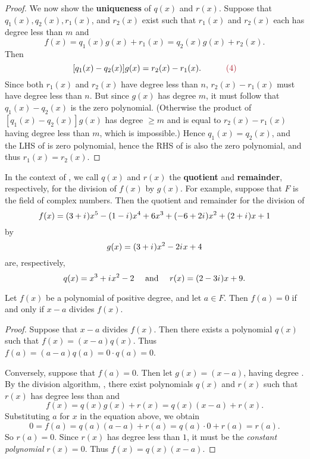 \begin{proof}
We now show the \textbf{uniqueness} of \(q(x)\) and \(r(x)\).
Suppose that \(q_1(x), q_2(x), r_1(x)\), and \(r_2(x)\) exist such that \(r_1(x)\) and \(r_2(x)\) each has degree less than \(m\) and
\[
    f(x) = q_1(x)g(x) + r_1(x) = q_2(x)g(x) + r_2(x).
\]
Then
\[
    [q_1(x)- q_2(x)]g(x) = r_2(x) - r_1(x). \quad \quad \quad \MAROON{(4)}
\]
Since both \(r_1(x)\) and \(r_2(x)\) have degree less than \(n\), \(r_2(x) - r_1(x)\) must have degree less than \(n\).
But since \(g(x)\) has degree \(m\), it must follow that \(q_1(x) - q_2(x)\) is the zero polynomial.
(Otherwise the product of \([q_1(x)- q_2(x)]g(x)\) has degree \(\ge m\) and is equal to \(r_2(x) - r_1(x)\) having degree less than \(m\), which is impossible.)
Hence \(q_1(x) = q_2(x)\), and the LHS of  is zero polynomial, hence the RHS of  is also the zero polynomial, and thus \(r_1(x) = r_2(x)\).
\end{proof}

\begin{remark} \label{remark e.1}
In the context of , we call \(q(x)\) and \(r(x)\) the \textbf{quotient} and \textbf{remainder}, respectively, for the division of \(f(x)\) by \(g(x)\).
For example, suppose that \(F\) is the field of complex numbers.
Then the quotient and remainder for the division of
\[
    f(x) = (3 + {i\mkern1mu})x^5 - (1 - {i\mkern1mu})x^4 + 6x^3 + (-6 + 2{i\mkern1mu})x^2 + (2 + {i\mkern1mu})x + 1
\]
by
\[
    g(x) = (3 + {i\mkern1mu})x^2 - 2{i\mkern1mu} x + 4
\]
are, respectively,
\[
    q(x) = x^3 + {i\mkern1mu} x^2 - 2 \quad \text{ and } \quad r(x) = (2 - 3{i\mkern1mu})x + 9.
\]
\end{remark}

\begin{appendix corollary} \label{corollary e.1.1}
Let \(f(x)\) be a polynomial of positive degree, and let \(a \in F\).
Then \(f(a) = 0\) if and only if \(x - a\) divides \(f(x)\).
\end{appendix corollary}

\begin{proof}
Suppose that \(x - a\) divides \(f(x)\).
Then there exists a polynomial \(q(x)\) such that \(f(x) = (x - a)q(x)\).
Thus \(f(a) = (a - a)q(a) = 0 \cdot q(a) = 0\).

Conversely, suppose that \(f(a) = 0\).
Then let \(g(x) = (x - a)\), having degree .
By the division algorithm, , there exist polynomials \(q(x)\) and \(r(x)\) such that \(r(x)\) has degree less than  and
\[
    f(x) = q(x)g(x) + r(x) = q(x)(x - a) + r(x).
\]
Substituting \(a\) for \(x\) in the equation above, we obtain
\[
    0 = f(a) = q(a)(a - a) + r(a) = q(a) \cdot 0 + r(a) = r(a).
\]
So \(r(a) = 0\).
Since \(r(x)\) has degree less than \(1\), it must be the \emph{constant polynomial} \(r(x) = 0\).
Thus \(f(x) = q(x)(x - a)\).
\end{proof}

